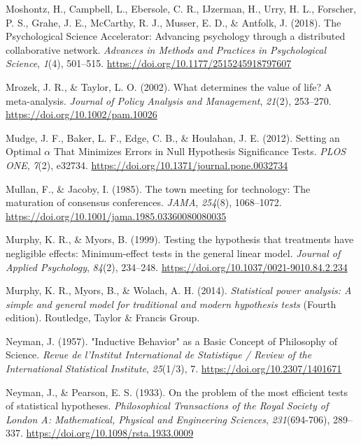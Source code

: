 \documentclass[
  oneside]{krantz}
\newlength{\cslhangindent}
\newlength{\cslentryspacingunit} %
\newenvironment{CSLReferences}[2] %
 {%
  \setlength{\parindent}{0pt}
  \ifodd #1
  \let\oldpar\par
  \def\par{\hangindent=\cslhangindent\oldpar}
  \fi
  \setlength{\parskip}{#2\cslentryspacingunit}
 }%
 {}
\begin{document}
\begin{CSLReferences}{1}{0}
\leavevmode{}%
Moshontz, H., Campbell, L., Ebersole, C. R., IJzerman, H., Urry, H. L.,
Forscher, P. S., Grahe, J. E., McCarthy, R. J., Musser, E. D., \&
Antfolk, J. (2018). The {Psychological Science Accelerator}: {Advancing}
psychology through a distributed collaborative network. \emph{Advances
in Methods and Practices in Psychological Science}, \emph{1}(4),
501--515. \url{https://doi.org/10.1177/2515245918797607}

\leavevmode{}%
Mrozek, J. R., \& Taylor, L. O. (2002). What determines the value of
life? A meta-analysis. \emph{Journal of Policy Analysis and Management},
\emph{21}(2), 253--270. \url{https://doi.org/10.1002/pam.10026}

\leavevmode{}%
Mudge, J. F., Baker, L. F., Edge, C. B., \& Houlahan, J. E. (2012).
Setting an {Optimal} {\(\alpha\)} {That Minimizes Errors} in {Null
Hypothesis Significance Tests}. \emph{PLOS ONE}, \emph{7}(2), e32734.
\url{https://doi.org/10.1371/journal.pone.0032734}

\leavevmode{}%
Mullan, F., \& Jacoby, I. (1985). The town meeting for technology: {The}
maturation of consensus conferences. \emph{JAMA}, \emph{254}(8),
1068--1072. \url{https://doi.org/10.1001/jama.1985.03360080080035}

\leavevmode{}%
Murphy, K. R., \& Myors, B. (1999). Testing the hypothesis that
treatments have negligible effects: {Minimum-effect} tests in the
general linear model. \emph{Journal of Applied Psychology},
\emph{84}(2), 234--248. \url{https://doi.org/10.1037/0021-9010.84.2.234}

\leavevmode{}%
Murphy, K. R., Myors, B., \& Wolach, A. H. (2014). \emph{Statistical
power analysis: A simple and general model for traditional and modern
hypothesis tests} (Fourth edition). {Routledge, Taylor \& Francis
Group}.

\leavevmode{}%
Neyman, J. (1957). "{Inductive Behavior}" as a {Basic Concept} of
{Philosophy} of {Science}. \emph{Revue de l'Institut International de
Statistique / Review of the International Statistical Institute},
\emph{25}(1/3), 7. \url{https://doi.org/10.2307/1401671}

\leavevmode{}%
Neyman, J., \& Pearson, E. S. (1933). On the problem of the most
efficient tests of statistical hypotheses. \emph{Philosophical
Transactions of the Royal Society of London A: Mathematical, Physical
and Engineering Sciences}, \emph{231}(694-706), 289--337.
\url{https://doi.org/10.1098/rsta.1933.0009}


\end{CSLReferences}
\end{document}
